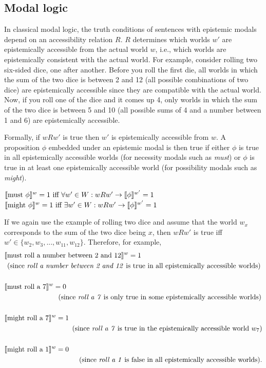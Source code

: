 \subsection{Modal logic}

In classical modal logic, the truth conditions of sentences with epistemic modals depend on an accessibility relation $R$.
$R$ determines which worlds $w'$ are epistemically accessible from the actual world $w$, i.e., which worlds are epistemically consistent with
the actual world. For example, consider rolling two six-sided dice, one after another. Before you roll the first die, all worlds in which the sum of
the two dice is between 2 and 12 (all possible combinations of two dice) are epistemically accessible since they are compatible with the actual
world. Now, if you roll one of the dice and it comes up 4, only worlds in which the sum of the two dice is between 5 and 10 (all possible sums of 4 and 
a number between 1 and 6) are epistemically accessible. 

Formally, if $wRw'$ is true then $w'$ is epistemically accessible from $w$. A proposition $\phi$ embedded under an epistemic modal is then true
if either $\phi$ is  true in all epistemically accessible worlds (for necessity modals such as \textit{must}) or $\phi$ is true in at least one epistemically 
accessible world (for possibility modals such as \textit{might}).

\begin{exe}
\ex \label{ex:modall-must} $\llbracket\mbox{must } \phi\rrbracket^{w}  = 1 \mbox{ iff } \forall w' \in W: wRw' \rightarrow  \llbracket\phi\rrbracket^{w'} = 1$
\ex \label{ex:modall-might} $\llbracket\mbox{might } \phi\rrbracket^{w}  = 1 \mbox{ iff } \exists w' \in W: wRw' \rightarrow  \llbracket\phi\rrbracket^{w'} = 1$
\end{exe}

If we again use the example of rolling two dice and assume that the world $w_x$ corresponds to the sum 
of the two dice being $x$, then $wRw'$ is true iff $w' \in \{w_2, w_3, ..., w_{11}, w_{12}\}$. Therefore, for example,
\begin{align*}
\llbracket&\mbox{must roll a number between 2 and 12}\rrbracket^{w} =  1 \\
 & \mbox{(since \textit{roll a number between 2 and 12} is true in all epistemically accessible worlds)} \\ \\ 
 \llbracket&\mbox{must roll a 7}\rrbracket^{w} =  0 \\
 & \qquad \qquad \qquad \quad \mbox{ (since \textit{roll a 7} is only true in some epistemically accessible worlds)} \\ \\
 \llbracket&\mbox{might roll a 7}\rrbracket^{w} =  1 \\
 &  \qquad \qquad \qquad \qquad \quad \mbox{ (since \textit{roll a 7} is true in the epistemically accessible world }w_7\mbox{)}\\ \\ 
 \llbracket&\mbox{might roll a 1}\rrbracket^{w} =  0 \\
 &  \qquad \qquad \qquad \qquad \qquad \mbox{\  (since \textit{roll a 1} is false in all epistemically accessible worlds).}
\end{align*}

